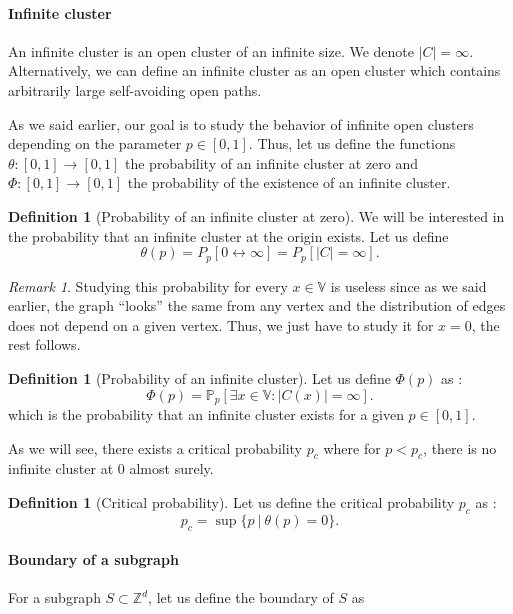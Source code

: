 \documentclass[a4paper,11pt]{article}
\theoremstyle{plain}
\theoremstyle{definition}
\newtheorem{definition}[theorem]{Definition}
\theoremstyle{remark}
\newtheorem*{remark}{Remark}
\begin{document}
\paragraph{Infinite cluster}
An infinite cluster is an open cluster of an infinite size. We denote $|C|=\infty$. Alternatively, we can define an infinite cluster as an open cluster which contains arbitrarily large self-avoiding open paths. 

As we said earlier, our goal is to study the behavior of infinite open clusters depending on the parameter $p \in [0,1]$. Thus, let us define the functions $\theta : [0,1] \longrightarrow [0,1]$ the probability of an infinite cluster at zero and $\Phi : [0,1] \longrightarrow [0,1]$ the probability of the existence of an infinite cluster.

\begin{definition}[Probability of an infinite cluster at zero]
We will be interested in the probability that an infinite cluster at the origin exists.
Let us define
\[\theta(p) = P_p[0 \longleftrightarrow \infty] = P_p[|C|=\infty].\]
\end{definition}

\begin{remark}
Studying this probability for every $x \in \mathbb{V}$ is useless since as we said earlier, the graph ``looks'' the same from any vertex and the distribution of edges does not depend on a given vertex. Thus, we just have to study it for $x = 0$, the rest follows.
\end{remark}

\begin{definition}[Probability of an infinite cluster]
Let us define $\Phi(p)$ as :
\[ \Phi(p) = \mathbb{P}_p[\exists x \in \mathbb{V} : |C(x)| = \infty]. \]
which is the probability that an infinite cluster exists for a given $p \in [0,1]$.
\end{definition}

As we will see, there exists a critical probability $p_c$ where for $p < p_c$, there is no infinite cluster at $0$ almost surely.

\begin{definition}[Critical probability]
Let us define the critical probability $p_c$ as :
\[p_c = \sup\{p \ | \ \theta(p)=0\}.\]
\end{definition}

\paragraph{Boundary of a subgraph}
For a subgraph $S \subset \mathbb{Z}^d$, let us define the boundary of $S$ as
\end{document}
